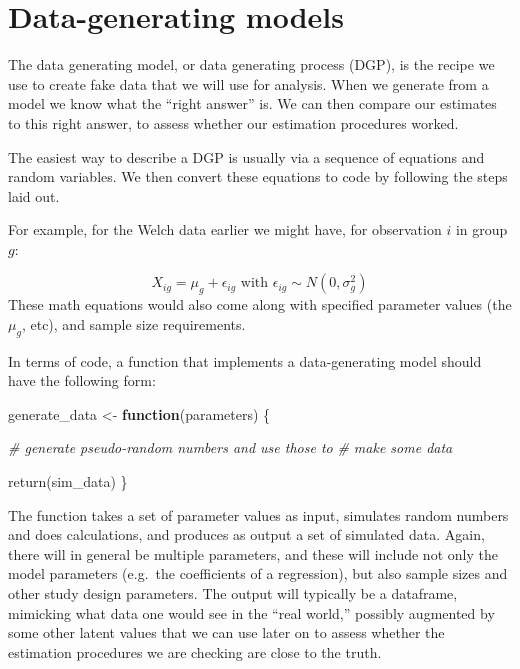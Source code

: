 \documentclass[
]{book}
\newenvironment{Shaded}{\begin{snugshade}}{\end{snugshade}}
\newcommand{\CommentTok}[1]{\textcolor[rgb]{0.56,0.35,0.01}{\textit{#1}}}
\newcommand{\ControlFlowTok}[1]{\textcolor[rgb]{0.13,0.29,0.53}{\textbf{#1}}}
\newcommand{\FunctionTok}[1]{\textcolor[rgb]{0.00,0.00,0.00}{#1}}
\newcommand{\NormalTok}[1]{#1}
\newcommand{\OtherTok}[1]{\textcolor[rgb]{0.56,0.35,0.01}{#1}}
\begin{document}
\hypertarget{data-generating-models}{%
\chapter{Data-generating models}\label{data-generating-models}}

The data generating model, or data generating process (DGP), is the recipe we use to create fake data that we will use for analysis.
When we generate from a model we know what the ``right answer'' is.
We can then compare our estimates to this right answer, to assess whether our estimation procedures worked.

The easiest way to describe a DGP is usually via a sequence of equations and random variables. We then convert these equations to code by following the steps laid out.

For example, for the Welch data earlier we might have, for observation \(i\) in group \(g\):

\[ X_{ig} = \mu_g + \epsilon_{ig} \mbox{ with } \epsilon_{ig} \sim N( 0, \sigma^2_g ) \]
These math equations would also come along with specified parameter values (the \(\mu_g\), etc), and sample size requirements.

In terms of code, a function that implements a data-generating model should have the following form:

\begin{Shaded}
\begin{Highlighting}[]
\NormalTok{generate\_data }\OtherTok{\textless{}{-}} \ControlFlowTok{function}\NormalTok{(parameters) \{}

  \CommentTok{\# generate pseudo{-}random numbers and use those to}
  \CommentTok{\# make some data}
  
  \FunctionTok{return}\NormalTok{(sim\_data)}
\NormalTok{\}}
\end{Highlighting}
\end{Shaded}

The function takes a set of parameter values as input, simulates random numbers and does calculations, and produces as output a set of simulated data.
Again, there will in general be multiple parameters, and these will include not only the model parameters (e.g.~the coefficients of a regression), but also sample sizes and other study design parameters.
The output will typically be a dataframe, mimicking what data one would see in the ``real world,'' possibly augmented by some other latent values that we can use later on to assess whether the estimation procedures we are checking are close to the truth.
\end{document}
